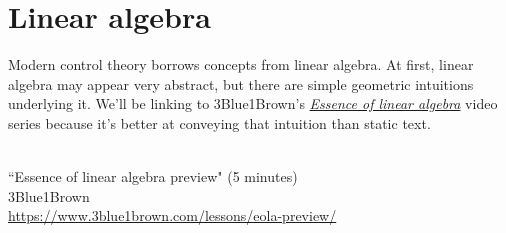 
\chapter{Linear algebra}

Modern control theory borrows concepts from linear algebra. At first, linear
algebra may appear very abstract, but there are simple geometric intuitions
underlying it. We'll be linking to 3Blue1Brown's
\href{https://www.3blue1brown.com/?topic=linear-algebra}{\textit{Essence of
linear algebra}} video series because it's better at conveying that intuition
than static text.
\begin{bookfigure}
   \\
  ``Essence of linear algebra preview" (5 minutes) \\
  \footnotesize 3Blue1Brown \\
  \url{https://www.3blue1brown.com/lessons/eola-preview/}
\end{bookfigure}

\renewcommand*{\chapterpath}{\partpath/linear-algebra}















